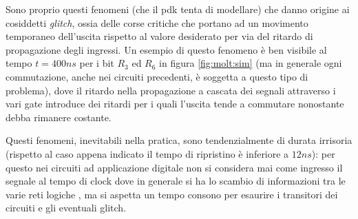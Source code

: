 	Sono proprio questi fenomeni (che il pdk tenta di modellare) che danno origine ai cosiddetti \textit{glitch}, ossia delle corse critiche che portano ad un movimento temporaneo dell'uscita rispetto al valore desiderato per via del ritardo di propagazione degli ingressi. Un esempio di questo fenomeno è ben visibile al tempo $t=400ns$ per i bit $R_3$ ed $R_6$ in figura \ref{fig:molt:sim} (ma in generale ogni commutazione, anche nei circuiti precedenti, è soggetta a questo tipo di problema), dove il ritardo nella propagazione a cascata dei segnali attraverso i vari gate introduce dei ritardi per i quali l'uscita tende a commutare nonostante debba rimanere costante.
	
	Questi fenomeni, inevitabili nella pratica, sono tendenzialmente di durata irrisoria (rispetto al caso appena indicato il tempo di ripristino è inferiore a $12ns$): per questo nei circuiti ad applicazione digitale non si considera mai come ingresso il segnale al tempo di clock dove in generale si ha lo scambio di informazioni tra le varie reti logiche	, ma si aspetta un tempo consono per esaurire i transitori dei circuiti e gli eventuali glitch.
	
	
	
	